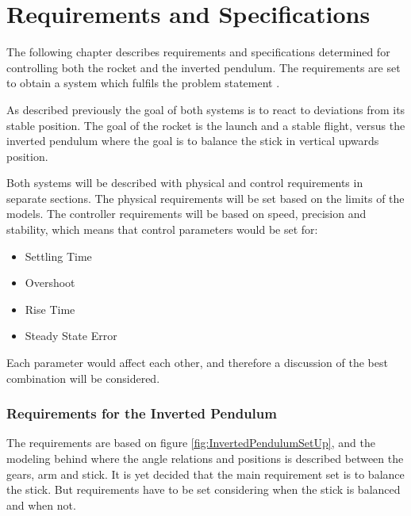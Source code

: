 \chapter{Requirements and Specifications}
The following chapter describes requirements and specifications determined for controlling both the rocket and the inverted pendulum. The requirements are set to obtain a system which fulfils the problem statement .

As described previously the goal of both systems is to react to deviations from its stable position. The goal of the rocket is the launch and a stable flight, versus the inverted pendulum where the goal is to balance the stick in vertical upwards position.  

Both systems will be described with physical and control requirements in separate sections. The physical requirements will be set based on the limits of the models. 
The controller requirements will be based on speed, precision and stability, which means that control parameters would be set for:

\begin{itemize}[noitemsep]
\item Settling Time
\item Overshoot
\item Rise Time
\item Steady State Error
\end{itemize}

Each parameter would affect each other, and therefore a discussion of the best combination will be considered.
\newpage
\subsection{Requirements for the Inverted Pendulum}\label{sec:InvPendReq}
The requirements are based on figure \ref{fig:InvertedPendulumSetUp}, and the modeling behind where the angle relations and positions is described between the gears, arm and stick. It is yet decided that the main requirement set is to balance the stick. But requirements have to be set considering when the stick is balanced and when not. 

\setlength{\parindent}{0pt}
\newcommand{\forceindent}{\leavevmode{\parindent=1em\indent}}


